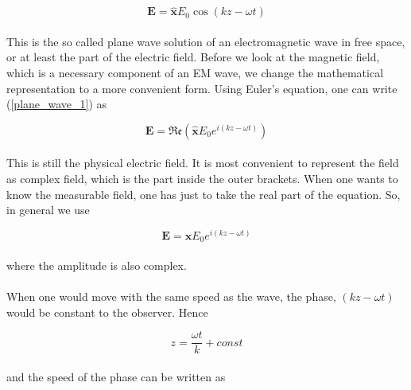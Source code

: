 \documentclass[a4paper,10pt]{thesis}
\begin{document}
\begin{equation}\label{plane_wave_1}
    \mathbf{E}= \mathbf{\hat{x}}E_0\cos(kz-\omega t)
\end{equation}

\paragraph*{}
This is the so called plane wave solution of an electromagnetic wave in free space, or at least the part of the electric field. Before we look at the magnetic field, which is a necessary component of an EM wave, we change the mathematical representation to a more convenient form. Using Euler's equation, one can write (\ref{plane_wave_1}) as

\begin{equation}\label{plane_wave_2}
    \mathbf{E}= \mathfrak{Re} \left( \mathbf{\hat{x}}E_0 e^{i(kz-\omega t)} \right)
\end{equation}

\paragraph*{}
This is still the physical electric field. It is most convenient to represent the field as complex field, which is the part inside the outer brackets. When one wants to know the measurable field, one has just to take the real part of the equation. So, in general we use

\begin{equation}\label{plane_wave_3}
    \mathbf{E}= \mathbf{\hat{x}}E_0 e^{i(kz-\omega t)}
\end{equation}

\paragraph*{}
where the amplitude is also complex.

\paragraph*{}
When one would move with the same speed as the wave, the phase, $(kz-\omega t)$ would be constant to the observer. Hence

\begin{equation}
    z= \frac{\omega t}{k}+ const
\end{equation}

\paragraph*{}
and the speed of the phase can be written as
\end{document}
